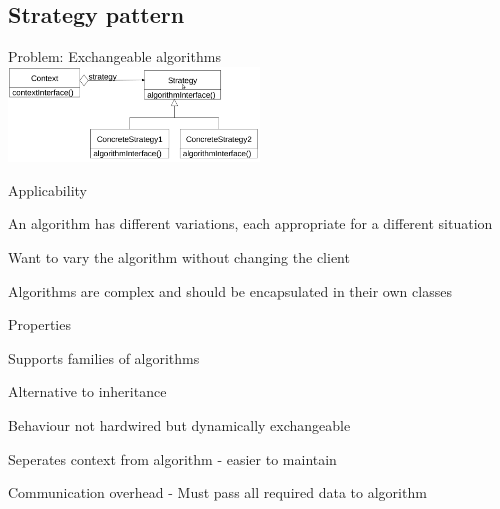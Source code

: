 \documentclass[10pt]{article}
\begin{document}
\subsection{Strategy pattern}
\enumstart
	\item Problem: Exchangeable algorithms
	\\ \includegraphics[width=0.5\textwidth]{strategy_pattern.png}
	\item Applicability
	\enumstart
		\item An algorithm has different variations, each appropriate for a different situation
		\item Want to vary the algorithm without changing the client
		\item Algorithms are complex and should be encapsulated in their own classes
	\enumend
	\item Properties
	\enumstart
		\item Supports families of algorithms
		\item Alternative to inheritance
		\enumstart
			\item Behaviour not hardwired but dynamically exchangeable
			\item Seperates context from algorithm - easier to maintain
		\enumend
		\item Communication overhead - Must pass all required data to algorithm
	\enumend
\enumend
\end{document}
